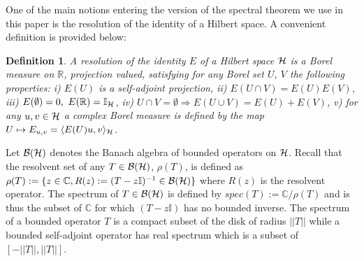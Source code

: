 \documentclass[a4paper,11pt,twoside]{article}
\numberwithin{equation}{section}
\newcommand\bbone{{ \mathbb{I}}}
\newtheorem{adefinition}{Definition}
\theoremstyle{nonumberplain}
\begin{document}
One of the main notions entering the version of the spectral theorem we use in this paper is the resolution of the identity of a Hilbert space. A convenient definition is provided below:
\begin{adefinition}\label{resolution}
A resolution of the identity $E$ of a Hilbert space ${\cal{H}}$ is a Borel measure on $\mathbb{R}$, projection valued, satisfying for any Borel set $U,\ V$ the following properties: i) $E(U)$ is a self-adjoint projection, ii) $E(U\cap V)=E(U)E(V)$, iii) $E(\emptyset)=0,\ E(\mathbb{R})=\bbone_{{\cal{H}}}$, iv) $U\cap V=\emptyset\Rightarrow E(U\cup V)=E(U)+E(V)$, v) for any $u,v\in\cal{H}$ a complex Borel measure is defined by the map $U\mapsto E_{u,v}=\langle E(U)u,v \rangle_{\cal{H}}$.
\end{adefinition}
Let ${\cal{B}}({\cal{H}})$ denotes the Banach algebra of bounded operators on ${\cal{H}}$. Recall that the resolvent set of any $T\in{\cal{B}}({\cal{H}})$, $\rho(T)$, is defined as $\rho(T):=\{z\in\mathbb{C}, R(z):=(T-z\bbone)^{-1}\in{\cal{B}}({\cal{H}})  \}$ where $R(z)$ is the resolvent operator. The spectrum of $T\in{\cal{B}}({\cal{H}})$ is defined by $spec(T):=\mathbb{C}/\rho(T)$ and is thus the subset of $\mathbb{C}$ for which $(T-z\bbone)$ has no bounded inverse. The spectrum of a bounded operator $T$ is a compact subset of the disk of radius $||T||$ while a bounded self-adjoint operator has real spectrum which is a subset of 
$[-||T||,||T||]$.\par
\end{document}
